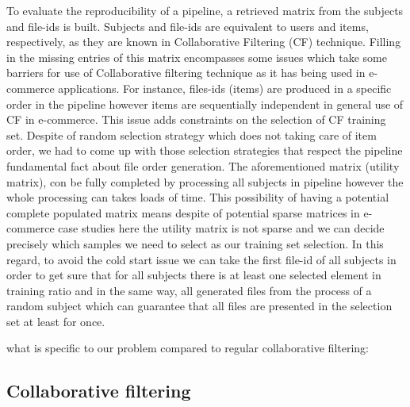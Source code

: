 \documentclass[10pt, conference, compsocconf]{IEEEtran}
\begin{document}
To evaluate the reproducibility of a pipeline, a retrieved matrix from 
the subjects and file-ids is built. Subjects and file-ids are equivalent 
to users and items, respectively, as they are known in Collaborative Filtering (CF) technique.
Filling in the missing entries of this matrix encompasses some issues 
which take some barriers for use of Collaborative filtering technique as it 
has being used in e-commerce applications.
For instance, files-ids (items) are produced in a specific order in the 
pipeline however items are sequentially independent in general use of CF in e-commerce.
This issue adds constraints on the selection of CF training set. Despite of random 
selection strategy which does not taking care of item order, we had to come up with those 
selection strategies that respect the pipeline fundamental fact about file order generation.  
The aforementioned matrix (utility matrix), con be fully completed by processing all subjects 
in pipeline however the whole processing can takes loads of time. This possibility of 
having a potential complete populated matrix means despite of potential sparse matrices 
in e-commerce case studies here the utility matrix is not sparse and 
we can decide precisely which samples we need to select as our training set selection. 
In this regard, to avoid the cold start issue we can take the first file-id of all 
subjects in order to get sure that for all subjects there is at least one 
selected element in training ratio and in the same way, all generated files 
from the process of a random subject which can guarantee that all files 
are presented in the selection set at least for once. 
 

 
what is specific to our problem compared to regular collaborative filtering:

\subsection{Collaborative filtering}
\end{document}
